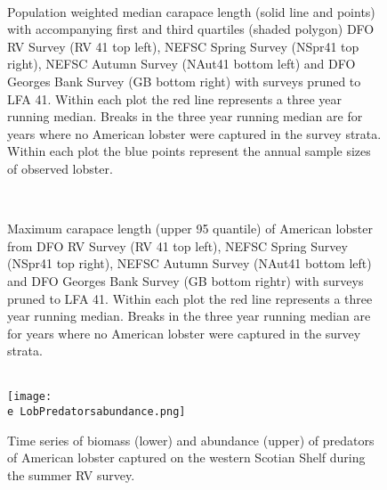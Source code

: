 \documentclass[11pt]{article}
\newcommand{\D}{.}
\newcommand{\e}{/SpinDr/backup/bio_data/bio.lobster/figures/} %
\begin{document}
\begin{figure}
\centering
{}\\

\caption{Population weighted median carapace length (solid line and points) with accompanying first and third quartiles (shaded polygon) DFO RV Survey (RV 41 top left), NEFSC Spring Survey (NSpr41 top right), NEFSC Autumn Survey (NAut41 bottom left) and DFO Georges Bank Survey (GB bottom right) with surveys pruned to LFA 41. Within each plot the red line represents a three year running median. Breaks in the three year running median are for years where no American lobster were captured in the survey strata. Within each plot the blue points represent the annual sample sizes of observed lobster.}
\end{figure}
\clearpage




\begin{figure}
\centering
{}\\

\caption{Maximum carapace length (upper 95 quantile) of American lobster from DFO RV Survey (RV 41 top left), NEFSC Spring Survey (NSpr41 top right), NEFSC Autumn Survey (NAut41 bottom left) and DFO Georges Bank Survey (GB bottom rightr) with surveys pruned to LFA 41. Within each plot the red line represents a three year running median. Breaks in the three year running median are for years where no American lobster were captured in the survey strata. }
\end{figure}
\clearpage


\begin{figure}
\centering
    \\
    \texttt{[image: \\e LobPredatorsabundance.png]}\\
    \caption{Time series of biomass (lower) and abundance (upper) of predators of American lobster captured on the western Scotian Shelf during the summer RV survey.}

\end{figure}
\end{document}

